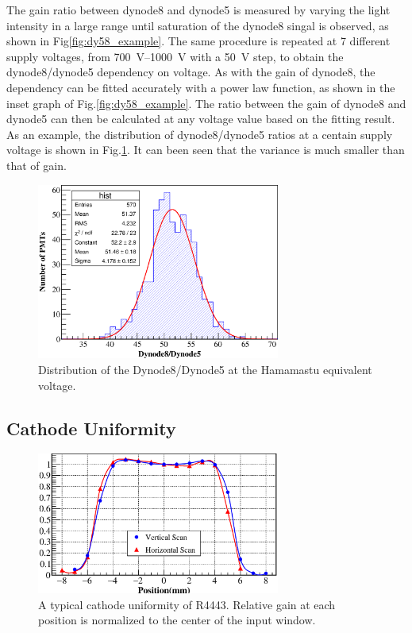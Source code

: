 \documentclass[5p, times]{elsarticle}
\begin{document}
The gain ratio between dynode8 and dynode5 is measured by varying the light intensity in a large range until saturation of the dynode8 singal is observed, as shown in Fig\ref{fig:dy58_example}.
The same procedure is repeated at 7 different supply voltages, from \SIrange{700}{1000}{\volt} with a \SI{50}{\volt} step, to obtain the dynode8/dynode5 dependency on voltage.
As with the gain of dynode8, the dependency can be fitted accurately with a power law function, as shown in the inset graph of Fig.\ref{fig:dy58_example}.
The ratio between the gain of dynode8 and dynode5 can then be calculated at any voltage value based on the fitting result.
As an example, the distribution of dynode8/dynode5 ratios at a centain supply voltage is shown in Fig.\ref{fig:dy58_dist}.
It can been seen that the variance is much smaller than that of gain.

\begin{figure}
 \centering
 \includegraphics[width=80mm]{dy58_dist}
\caption{Distribution of the Dynode8/Dynode5 at the Hamamastu equivalent voltage.}
\label{fig:dy58_dist}
\end{figure} 

\subsection{Cathode Uniformity}
\label{sec:psd_cathodescan}

\begin{figure}
 \centering
 \includegraphics[width=80mm]{cathode_uniformity}
\caption{A typical cathode uniformity of R4443.
Relative gain at each position is normalized to the center of the input window.}
\label{fig:cathode_uniformity}
\end{figure} 
\end{document}
